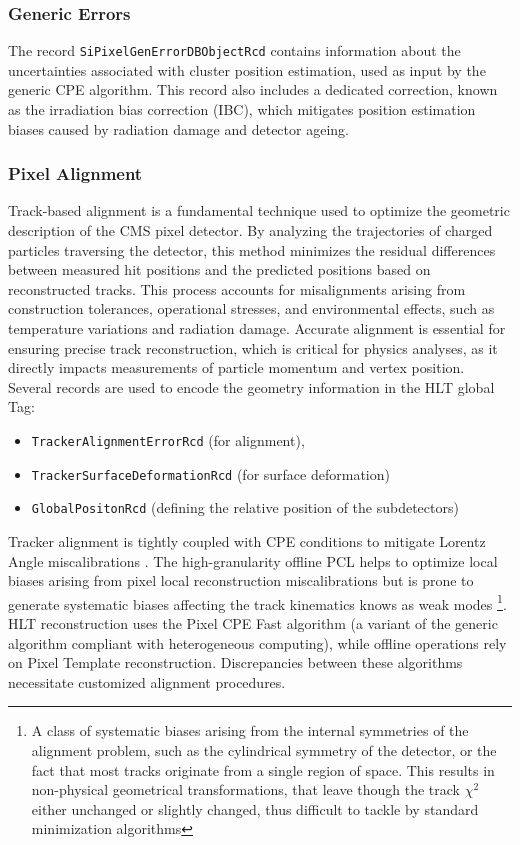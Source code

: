\subsubsection{Generic Errors}
The record \texttt{SiPixelGenErrorDBObjectRcd} contains information about the uncertainties associated with cluster position estimation, used as input by the generic CPE algorithm. This record also includes a dedicated correction, known as the irradiation bias correction (IBC), which mitigates position estimation biases caused by radiation damage and detector ageing.

\subsubsection{Pixel Alignment}
Track-based alignment is a fundamental technique used to optimize the geometric description of the CMS pixel detector. By analyzing the trajectories of charged particles traversing the detector, this method minimizes the residual differences between measured hit positions and the predicted positions based on reconstructed tracks. This process accounts for misalignments arising from construction tolerances, operational stresses, and environmental effects, such as temperature variations and radiation damage. Accurate alignment is essential for ensuring precise track reconstruction, which is critical for physics analyses, as it directly impacts measurements of particle momentum and vertex position.
Several records are used to encode the geometry information in the HLT global Tag: 
\begin{itemize}
\item \texttt{TrackerAlignmentErrorRcd} (for alignment), 
\item \texttt{TrackerSurfaceDeformationRcd} (for surface deformation)  \item \texttt{GlobalPositonRcd} (defining the relative position of the subdetectors) 
\end{itemize}

Tracker alignment is tightly coupled with CPE conditions to mitigate Lorentz Angle miscalibrations \cite{CMS:2022ali}. The high-granularity offline PCL helps to optimize local biases arising from pixel local reconstruction miscalibrations but is prone to generate systematic biases affecting the track kinematics knows as weak modes \footnote{A class of systematic biases arising from the internal symmetries of the alignment problem, such as the cylindrical symmetry of the detector, or the fact that most tracks originate from a single region of space. This results in non-physical geometrical transformations, that leave though the track $\chi^{2}$ either unchanged or slightly changed, thus difficult to tackle by standard minimization algorithms}.
HLT reconstruction uses the Pixel CPE Fast algorithm (a variant of the generic algorithm compliant with heterogeneous computing), while offline operations rely on Pixel Template reconstruction. Discrepancies between these algorithms necessitate customized alignment procedures.

